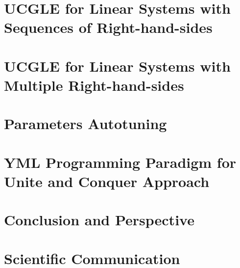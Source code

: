 \documentclass{xinzhewu}
\begin{document}


\chapter{UCGLE for Linear Systems with Sequences of Right-hand-sides}\label{UCGLE for Linear Systems with Sequences of Right-hand-sides}



\chapter{UCGLE for Linear Systems with Multiple Right-hand-sides} \label{UCGLE for Linear Systems with Multiple Right-hand-sides}



\chapter{Parameters Autotuning}  \label{Parameters Autotuning}



\chapter{YML Programming Paradigm for Unite and Conquer Approach} \label{YML and XMP Multi-level Parallelism Programming Paradigm}



\chapter{Conclusion and Perspective} \label{Conclusion and Pespectives}



\clearemptydoublepage


\clearemptydoublepage

\appendix
\chapter{Scientific Communication}



\clearemptydoublepage
\end{document}
